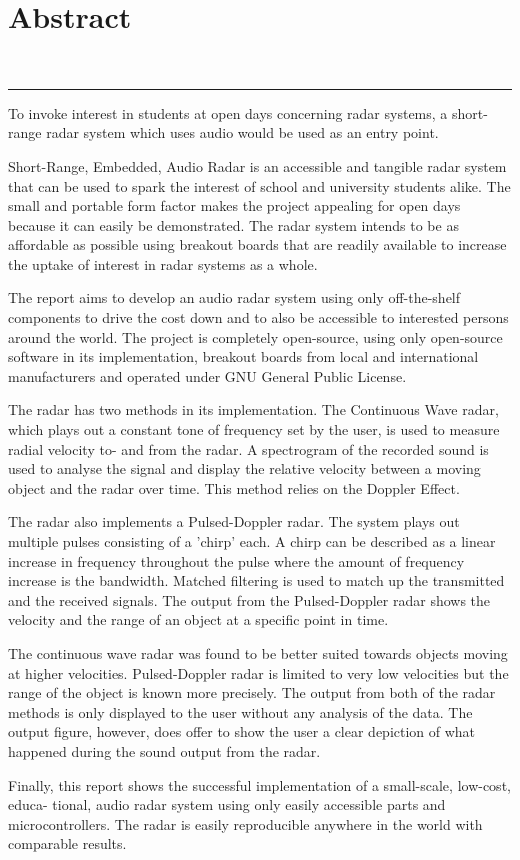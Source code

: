 {\smallest\chapter*{Abstract}\label{chap:Abstract}}\\
\hrule



To invoke interest in students at open days concerning radar systems, a short-range radar system which uses audio would be used as an entry point.

Short-Range, Embedded, Audio Radar is an accessible and tangible radar system that can be used to spark the interest of school and university students alike. The small and portable form factor makes the project appealing for open days because it can easily be demonstrated. The radar system intends to be as affordable as possible using breakout boards that are readily available to increase the uptake of interest in radar systems as a whole.

The report aims to develop an audio radar system using only off-the-shelf components to drive the cost down and to also be accessible to interested persons around the world. The project is completely open-source, using only open-source software in its implementation, breakout boards from local and international manufacturers and operated under GNU General Public License. 

The radar has two methods in its implementation. The Continuous Wave radar, which plays out a constant tone of frequency set by the user, is used to measure radial velocity to- and from the radar. A spectrogram of the recorded sound is used to analyse the signal and display the relative velocity between a moving object and the radar over time. This method relies on the Doppler Effect.

The radar also implements a Pulsed-Doppler radar. The system plays out multiple pulses consisting of a 'chirp' each. A chirp can be described as a linear increase in frequency throughout the pulse where the amount of frequency increase is the bandwidth. Matched filtering is used to match up the transmitted and the received signals. The output from the Pulsed-Doppler radar shows the velocity and the range of an object at a specific point in time.

The continuous wave radar was found to be better suited towards objects moving at higher velocities. Pulsed-Doppler radar is limited to very low velocities but the range of the object is known more precisely. The output from both of the radar methods is only displayed to the user without any analysis of the data. The output figure, however, does offer to show the user a clear depiction of what happened during the sound output from the radar.

Finally, this report shows the successful implementation of a small-scale, low-cost, educa- tional, audio radar system using only easily accessible parts and microcontrollers. The radar is easily reproducible anywhere in the world with comparable results.

\newpage
